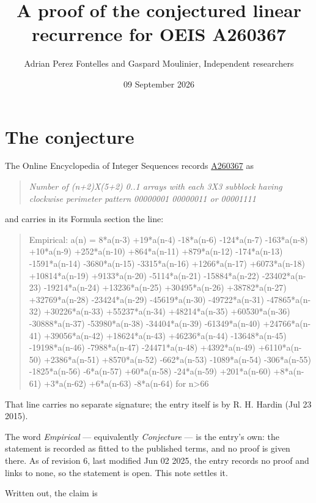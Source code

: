 \documentclass[11pt]{article}
\title{A proof of the conjectured linear recurrence for OEIS A260367}
\author{Adrian Perez Fontelles and Gaspard Moulinier, Independent researchers}
\date{09 September 2026}
\theoremstyle{definition}
\begin{document}
\maketitle
\section{The conjecture}

The Online Encyclopedia of Integer Sequences records \href{https://oeis.org/A260367}{A260367} as

\begin{quote}\itshape Number of (n+2)X(5+2) 0..1 arrays with each 3X3 subblock having clockwise perimeter pattern 00000001 00000011 or 00001111\end{quote}

and carries in its Formula section the line:

\begin{quote}\ttfamily Empirical: a(n) = 8*a(n-3) +19*a(n-4) -18*a(n-6) -124*a(n-7) -163*a(n-8) +10*a(n-9) +252*a(n-10) +864*a(n-11) +879*a(n-12) -174*a(n-13) -1591*a(n-14) -3680*a(n-15) -3315*a(n-16) +1266*a(n-17) +6073*a(n-18) +10814*a(n-19) +9133*a(n-20) -5114*a(n-21) -15884*a(n-22) -23402*a(n-23) -19214*a(n-24) +13236*a(n-25) +30495*a(n-26) +38782*a(n-27) +32769*a(n-28) -23424*a(n-29) -45619*a(n-30) -49722*a(n-31) -47865*a(n-32) +30226*a(n-33) +55237*a(n-34) +48214*a(n-35) +60530*a(n-36) -30888*a(n-37) -53980*a(n-38) -34404*a(n-39) -61349*a(n-40) +24766*a(n-41) +39056*a(n-42) +18624*a(n-43) +46236*a(n-44) -13648*a(n-45) -19198*a(n-46) -7988*a(n-47) -24471*a(n-48) +4392*a(n-49) +6110*a(n-50) +2386*a(n-51) +8570*a(n-52) -662*a(n-53) -1089*a(n-54) -306*a(n-55) -1825*a(n-56) -6*a(n-57) +60*a(n-58) -24*a(n-59) +201*a(n-60) +8*a(n-61) +3*a(n-62) +6*a(n-63) -8*a(n-64) for n>66\end{quote}

That line carries no separate signature; the entry itself is by R. H. Hardin (Jul 23 2015).

The word {\itshape Empirical} --- equivalently {\itshape Conjecture} --- is the entry's own: the statement is recorded as fitted to the published terms, and no proof is given there. As of revision 6, last modified Jun 02 2025, the entry records no proof and links to none, so the statement is open. This note settles it.

Written out, the claim is
\end{document}
